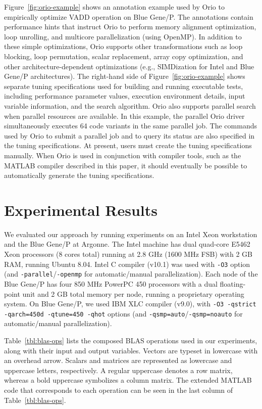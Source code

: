 \documentclass[runningheads]{llncs}
\begin{document}
Figure~\ref{fig:orio-example} shows an annotation example used by Orio
to empirically optimize VADD operation on Blue Gene/P. The annotations
contain performance hints that instruct Orio to perform memory
alignment optimization, loop unrolling, and multicore parallelization
(using OpenMP). In addition to these simple optimizations, Orio
supports other transformations such as loop blocking, loop
permutation, scalar replacement, array copy optimization, and other
architecture-dependent optimizations (e.g., SIMDization for Intel and
Blue Gene/P architectures). The right-hand side of
Figure~\ref{fig:orio-example} shows separate tuning specifications
used for building and running executable tests, including performance
parameter values, execution environment details, input variable
information, and the search algorithm. Orio also supports parallel
search when parallel resources are available. In this example, the
parallel Orio driver simultaneously executes 64 code variants in the
same parallel job. The commands used by Orio to submit a parallel job
and to query its status are also specified in the tuning
specifications. At present, users must create the tuning
specifications manually. When Orio is used in conjunction with
compiler tools, such as the MATLAB compiler described in this paper,
it should eventually be possible to automatically generate the tuning
specifications.

\vspace{-0.1in}

\section{Experimental Results}
\label{sec:experiments}

We evaluated our approach by running experiments on an Intel Xeon
workstation and the Blue Gene/P at Argonne. The Intel machine has dual
quad-core E5462 Xeon processors (8 cores total) running at 2.8 GHz
(1600 MHz FSB) with 2 GB RAM, running Ubuntu 8.04. Intel C compiler
(v10.1) was used with \texttt{-O3} option (and
\texttt{-parallel}/\texttt{-openmp} for automatic/manual
parallelization). Each node of the Blue Gene/P has four 850 MHz
PowerPC 450 processors with a dual floating-point unit and 2 GB total
memory per node, running a proprietary operating system. On Blue
Gene/P, we used IBM XLC compiler (v9.0), with \texttt{-O3 -qstrict
-qarch=450d -qtune=450 -qhot} options (and
\texttt{-qsmp=auto}/\texttt{-qsmp=noauto} for automatic/manual
parallelization).

Table~\ref{tbl:blas-ops} lists the composed BLAS operations used in
our experiments, along with their input and output variables. Vectors
are typeset in lowercase with an overhead arrow. Scalars and matrices
are represented as lowercase and uppercase letters, respectively. A
regular uppercase denotes a row matrix, whereas a bold uppercase
symbolizes a column matrix. The extended MATLAB code that corresponds
to each operation can be seen in the last column of
Table~\ref{tbl:blas-ops}.
\end{document}
